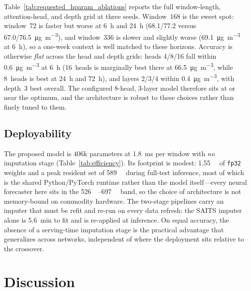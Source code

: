 \documentclass[review,3p,times]{elsarticle}
\newcommand{\ugm}{\si{\micro\gram\per\cubic\metre}}
\begin{document}
Table~\ref{tab:requested_hparam_ablations} reports the full window-length,
attention-head, and depth grid at three seeds. Window~168 is the sweet spot:
window~72 is faster but worse at \SI{6}{\hour} and \SI{24}{\hour}
(\SI{68.1}{}/\SI{77.2}{} versus \SI{67.0}{}/\SI{76.5}{\ugm}), and window~336 is
slower and slightly worse (\SI{69.1}{\ugm} at \SI{6}{\hour}), so a one-week
context is well matched to these horizons. Accuracy is otherwise \emph{flat}
across the head and depth grids: heads 4/8/16 fall within \SI{0.6}{\ugm} at
\SI{6}{\hour} (16~heads is marginally best there at \SI{66.5}{\ugm}, while
8~heads is best at \SI{24}{\hour} and \SI{72}{\hour}), and layers 2/3/4 within
\SI{0.4}{\ugm}, with depth~3 best overall. The configured 8-head, 3-layer model
therefore sits at or near the optimum, and the architecture is robust to these
choices rather than finely tuned to them.




\subsection{Deployability}
\label{sec:efficiency}

The proposed model is \num{406}k parameters at \SI{1.8}{\milli\second} per
window with \emph{no} imputation stage (Table~\ref{tab:efficiency}). Its
footprint is modest: \SI{1.55}{\mega\byte} of \texttt{fp32} weights and a peak
resident set of \SI{589}{\mega\byte} during full-test inference, most of which
is the shared Python/PyTorch runtime rather than the model itself---every neural
forecaster here sits in the \SIrange{526}{697}{\mega\byte} band, so the choice of
architecture is not memory-bound on commodity hardware. The two-stage pipelines
carry an imputer that must be refit and re-run on every data refresh: the SAITS
imputer alone is \SI{5.6}{\minute} to fit and is re-applied at inference. On
equal accuracy, the absence of a serving-time imputation stage is the practical
advantage that generalizes across networks, independent of where the deployment
sits relative to the crossover.



\section{Discussion}
\label{sec:discussion}
\end{document}
